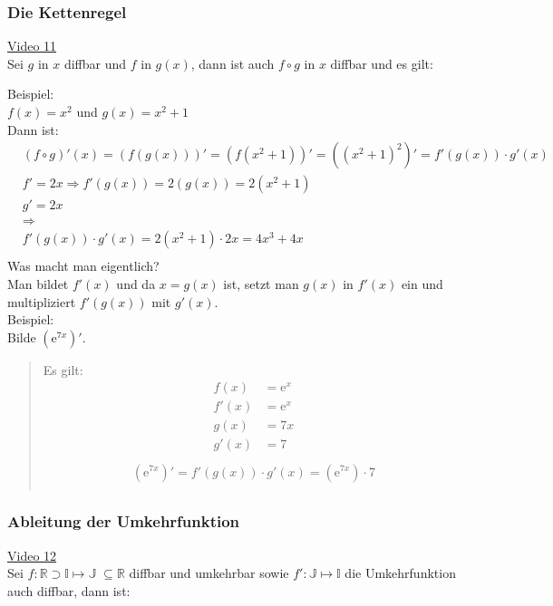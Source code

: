 \subsubsection{Die Kettenregel}
\href{https://youtu.be/tA1GHaDpCYE}{Video 11}\\
Sei $ g $ in $ x $ diffbar und $ f $ in $ g(x) $, dann ist auch $ f\circ g $ in $ x $ diffbar und es gilt:
\begin{center}
\end{center}
Beispiel:\\
$ f(x)=x^2 $ und $ g(x)=x^2+1 $\\
Dann ist:\\
\begin{align*}
&(f\circ g)'(x)=(f(g(x)))'=(f(x^2+1))'=((x^2+1)^2)'=f'(g(x))\cdot g'(x)\\
& f'=2x \Rightarrow f'(g(x))=2(g(x))=2(x^2+1)\\
& g'=2x\\
&\Rightarrow\\
&f'(g(x))\cdot g'(x)=2(x^2+1)\cdot 2x=4x^3+4x\\
\end{align*}
Was macht man eigentlich?\\
Man bildet $ f'(x) $ und da $ x = g(x) $ ist, setzt man $ g(x) $ in $ f'(x) $ ein und multipliziert $f'(g(x))  $ mit $ g'(x) $.\vspace*{2mm}\\
Beispiel:\\
Bilde $ (\mathrm{e}^{7x})' $.\\
\begin{quote}
	Es gilt:\\
	\begin{align*}
	f(x) &= \mathrm{e}^x\\
	f'(x)&=\mathrm{e}^x\\
	g(x)&=7x\\
	g'(x)&=7\\
	\end{align*}
	\begin{align*}
	(\mathrm{e}^{7x})'=f'(g(x))\cdot g'(x)=(\mathrm{e}^{7x})\cdot 7\\
	\end{align*}
	
	
\end{quote}
\subsubsection{Ableitung der Umkehrfunktion}
\href{https://youtu.be/1dFQ3JSPOpk}{Video 12}\\
Sei $ f:\mathbb{R}\supset \mathbb{I} \longmapsto \mathbb{J}\;\subseteq \mathbb{R}$ diffbar und umkehrbar sowie $ f':\mathbb{J}\longmapsto \mathbb{I} $ die Umkehrfunktion auch diffbar, dann ist:\\

